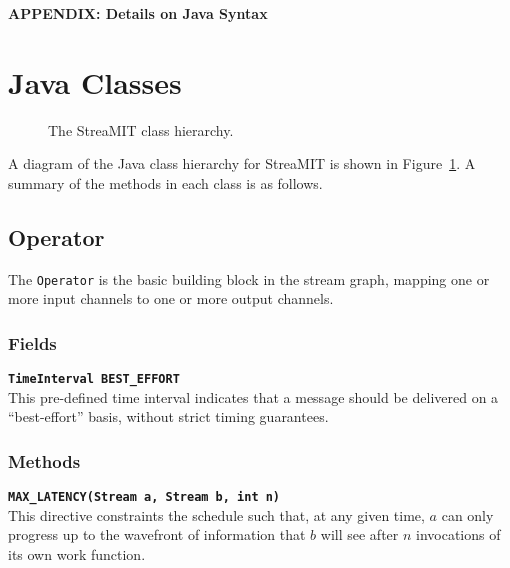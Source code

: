 \clearpage

\newcommand{\doc}[1]{{\bf {\tt #1}} \vspace{3pt} \\}

\renewcommand{\theequation}{A-\arabic{equation}}
\setcounter{equation}{0}  %
\setcounter{section}{0}

\begin{center}
{\bf APPENDIX:  Details on Java Syntax}
\end{center}

\section{Java Classes}

\begin{figure}
\centering
{}
\caption{\protect\small The StreaMIT class hierarchy.
\protect\label{fig:hierarchy}}
\end{figure}

A diagram of the Java class hierarchy for StreaMIT is shown in
Figure~\ref{fig:hierarchy}.  A summary of the methods in each class is
as follows.

\subsection{Operator}

The {\tt Operator} is the basic building block in the stream graph,
mapping one or more input channels to one or more output channels.

\subsubsection{Fields}

\doc{TimeInterval BEST\_EFFORT}  This pre-defined time interval
indicates that a message should be delivered on a ``best-effort''
basis, without strict timing guarantees.

\subsubsection{Methods}

\doc{MAX\_LATENCY(Stream a, Stream b, int n)}  This directive
constraints the schedule such that, at any given time, $a$ can only
progress up to the wavefront of information that $b$ will see after
$n$ invocations of its own work function.

